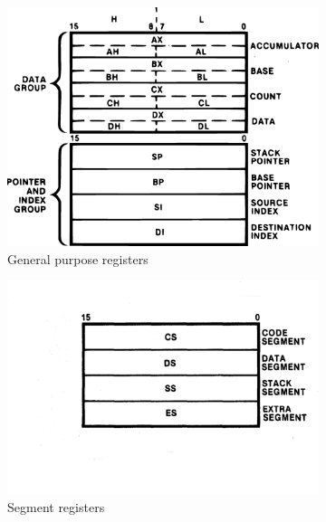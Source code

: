 \begin{figure}[h]
\centering
  \begin{subfigure}{.5\textwidth}
  \centering
  \includegraphics[scale=0.25]{figures/8086gpr.eps}
  \caption{General purpose registers}
  \label{fig:8086gpr}
  \end{subfigure}%
  \begin{subfigure}{.5\textwidth}
  \centering
  \includegraphics[scale=0.25]{figures/8086segr.eps}
  \caption{Segment registers}
  \label{fig:8086segr}
  \end{subfigure}
  \newline
  \begin{subfigure}{0.9\textwidth}
  \centering

\end{subfigure}
\end{figure}

